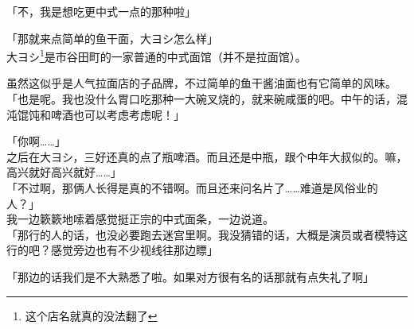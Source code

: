 「不，我是想吃更中式一点的那种啦」

「那就来点简单的鱼干面，大ヨシ怎么样」\\

大ヨシ\footnote{这个店名就真的没法翻了}是市谷田町的一家普通的中式面馆（并不是拉面馆）。

虽然这似乎是人气拉面店的子品牌，不过简单的鱼干酱油面也有它简单的风味。\\

「也是呢。我也没什么胃口吃那种一大碗叉烧的，就来碗咸蛋的吧。中午的话，混沌馄饨和啤酒也可以考虑考虑呢！」

「你啊……」\\

之后在大ヨシ，三好还真的点了瓶啤酒。而且还是中瓶，跟个中年大叔似的。嘛，高兴就好高兴就好……」\\

「不过啊，那俩人长得是真的不错啊。而且还来问名片了……难道是风俗业的人？」\\

我一边簌簌地嗦着感觉挺正宗的中式面条，一边说道。\\

「那行的人的话，也没必要跑去迷宫里啊。我没猜错的话，大概是演员或者模特这行的吧？感觉旁边也有不少视线往那边瞟」

「那边的话我们是不大熟悉了啦。如果对方很有名的话那就有点失礼了啊」

